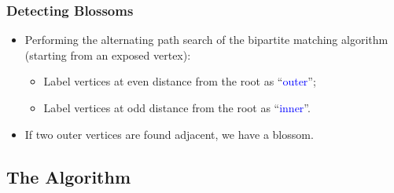 \documentclass[pdftex]{beamer}
\newcommand{\subbullet}{\color{mypurple}\scriptsize\ding{235}}
\newcommand{\blue}[1]{\textcolor{blue}{#1}}
\begin{document}
\begin{frame} \frametitle{Detecting Blossoms}
  \begin{itemize}
  \item Performing the alternating path search of the bipartite
    matching algorithm (starting from an exposed vertex):
    \begin{itemize}
    \item[\subbullet] Label vertices at even distance from the root as
      ``\blue{outer}'';
    \item[\subbullet] Label vertices at odd distance from the root as
      ``\blue{inner}''.
    \end{itemize}
  \item If two outer vertices are found adjacent, we have a blossom.
  \end{itemize}
  \begin{center}
    
  \end{center}
\end{frame}

\subsection{The Algorithm}
\end{document}
